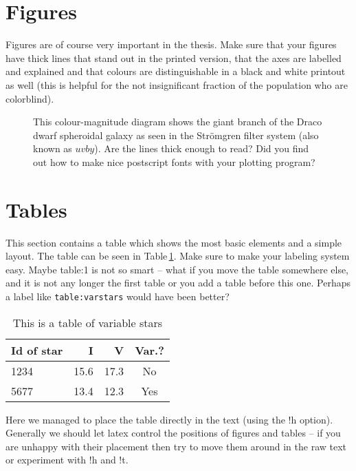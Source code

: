 \documentclass[a4paper,12pt]{article}
\begin{document}
\section{Figures}
\setcounter{equation}{0}

Figures are of course very important in the thesis. Make sure that your figures
have thick lines that stand out in the printed version, that the axes are
labelled and explained and that colours are distinguishable in a black and
white printout as well (this is helpful for the not insignificant fraction of
the population who are colorblind).
\begin{figure}
\caption[CMD of Draco]{This colour-magnitude diagram shows the giant branch of
the Draco dwarf spheroidal galaxy as seen in the Str\"omgren filter system
(also known as $uvby$). Are the lines thick enough to read? Did you find out
how to make nice postscript fonts with your plotting program?}
\end{figure}

\section{Tables}
\setcounter{equation}{0}

This section contains a table which shows the most basic elements and a simple
layout. The table can be seen in Table\,\ref{table:1}.  Make sure to make your
labeling system easy. Maybe table:1 is not so smart -- what if you move the
table somewhere else, and it is not any longer the first table or you add a
table before this one. Perhaps a label like {\tt table:varstars} would have
been better?
\begin{table}[!h]
\caption{This is a table of variable stars}\smallskip
\label{table:1}
\centering  
\begin{tabular}{lrrc}
\hline\hline  
\smallskip
Id of star & I &  V & Var.? \\
\hline
1234 & 15.6 & 17.3 & No \\
5677 & 13.4 & 12.3 & Yes\\
\hline
\end{tabular}
\end{table}

Here we managed to place the table directly in the text (using the !h option).
Generally we should let latex control the positions of figures and tables --
if you are unhappy with their placement then try to move them around in the raw
text or experiment with !h and !t.
\end{document}
